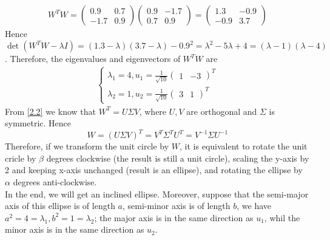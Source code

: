 \documentclass{article}
\begin{document}
    \subsection{}\label{2.3}
        \begin{align*}
            W^TW=\begin{pmatrix}
                0.9 &0.7\\
                -1.7 &0.9
            \end{pmatrix}\begin{pmatrix}
                0.9 &-1.7\\
                0.7 &0.9
            \end{pmatrix}
            =\begin{pmatrix}
                1.3 &-0.9\\
                -0.9 &3.7
            \end{pmatrix}
        \end{align*}
        Hence $\det(W^TW-\lambda I)=(1.3-\lambda)(3.7-\lambda)-0.9^2=\lambda^2-5\lambda+4=(\lambda-1)(\lambda-4)$. 
        Therefore, the eigenvalues and eigenvectors of $W^TW$ are
        \begin{align*}
            \begin{cases}
                \lambda_1=4, u_1=\frac{1}{\sqrt{10}}\begin{pmatrix}1&-3\end{pmatrix}^T\\
                \lambda_2=1, u_2=\frac{1}{\sqrt{10}}\begin{pmatrix}3&1\end{pmatrix}^T
            \end{cases}
        \end{align*}
        From \ref{2.2} we know that $W^T=U\Sigma V$, where $U, V$ are orthogonal and $\Sigma$ is symmetric.
        Hence 
        \begin{equation*}
            W=(U\Sigma V)^T=V^T\Sigma^TU^T=V^{-1}\Sigma U^{-1}
        \end{equation*}
        Therefore, if we transform the unit circle by $W$, 
        it is equivalent to rotate the unit cricle by $\beta$ degrees clockwise (the result is still a unit circle),
        scaling the y-axis by 2 and keeping x-axis unchanged (result is an ellipse), and rotating the ellipse by $\alpha$ degrees anti-clockwise.\\

        \noindent In the end, we will get an inclined ellipse. Moreover, suppose that the semi-major axis of this ellipse is of length $a$,
        semi-minor axis is of length $b$, we have $a^2=4=\lambda_1, b^2=1=\lambda_2$; 
        the major axis is in the same direction as $u_1$, whil the minor axis is in the same direction as $u_2$.\\
\end{document}

